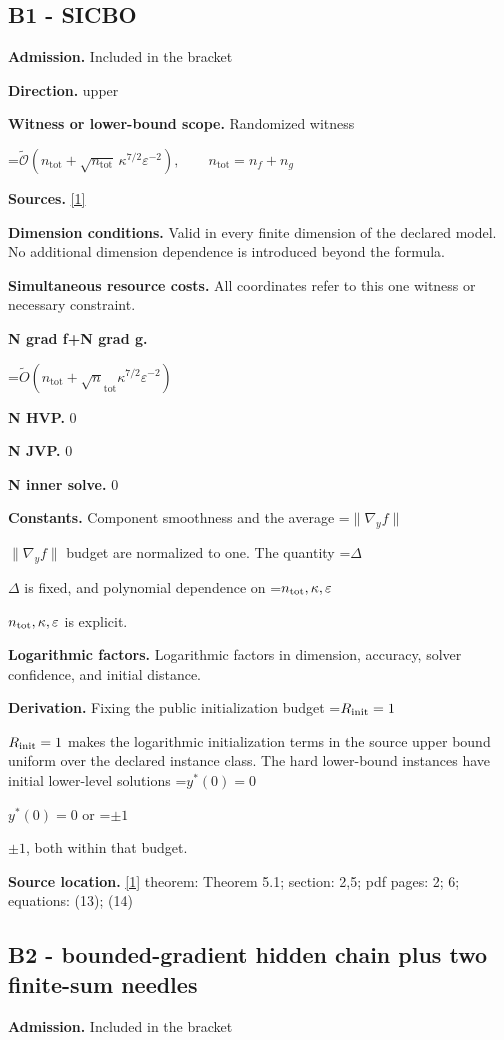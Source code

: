 \documentclass[10pt,a4paper]{article}
\newcommand{\AtlasMath}[1]{\par\begingroup\centering\setbox0=\hbox{$\displaystyle #1$}\ifdim\wd0>1.4\linewidth\typeout{ATLAS WIDE FORMULA: \the\wd0}\fi\ifdim\wd0>\linewidth\resizebox{\linewidth}{!}{\box0}\else\box0\fi\par\endgroup}
\newcommand{\AtlasInlineMath}[1]{\begingroup\setbox0=\hbox{$#1$}\ifdim\wd0>.4\linewidth\endgroup\AtlasMath{#1}\else\endgroup$#1$\fi}
\begin{document}
\subsection{B1 - SICBO}
\textbf{Admission.} Included in the bracket

\textbf{Direction.} upper

\textbf{Witness or lower-bound scope.} Randomized witness

\AtlasMath{\widetilde{\mathcal{O}}\!\left(n_{\mathrm{tot}}+\sqrt{n_{\mathrm{tot}}}\,\kappa^{7/2}\varepsilon^{-2}\right),\qquad n_{\mathrm{tot}}=n_f+n_g}
\textbf{Sources.} \href{https://arxiv.org/pdf/2610.24538v1}{[1]}

\textbf{Dimension conditions.} Valid in every finite dimension of the declared model. No additional dimension dependence is introduced beyond the formula.

\textbf{Simultaneous resource costs.} All coordinates refer to this one witness or necessary constraint.

\textbf{N grad f+N grad g.}

\AtlasMath{\widetilde O(n_{\mathrm{tot}}+\sqrt n_{\mathrm{tot}}\kappa ^{7/2}\varepsilon ^{-2})}
\textbf{N HVP.} 0

\textbf{N JVP.} 0

\textbf{N inner solve.} 0

\textbf{Constants.} Component smoothness and the average \AtlasInlineMath{\|\nabla_yf\|} budget are normalized to one. The quantity \AtlasInlineMath{\Delta} is fixed, and polynomial dependence on \AtlasInlineMath{n_{\rm tot},\kappa,\varepsilon} is explicit.

\textbf{Logarithmic factors.} Logarithmic factors in dimension, accuracy, solver confidence, and initial distance.

\textbf{Derivation.} Fixing the public initialization budget \AtlasInlineMath{R_{\rm init}=1} makes the logarithmic initialization terms in the source upper bound uniform over the declared instance class. The hard lower-bound instances have initial lower-level solutions \AtlasInlineMath{y^*(0)=0} or \AtlasInlineMath{\pm1}, both within that budget.

\textbf{Source location.} \href{https://arxiv.org/pdf/2610.24538v1}{[1]} theorem: Theorem 5.1; section: 2,5; pdf pages: 2; 6; equations: (13); (14)

\subsection{B2 - bounded-gradient hidden chain plus two finite-sum needles}
\textbf{Admission.} Included in the bracket
\end{document}
